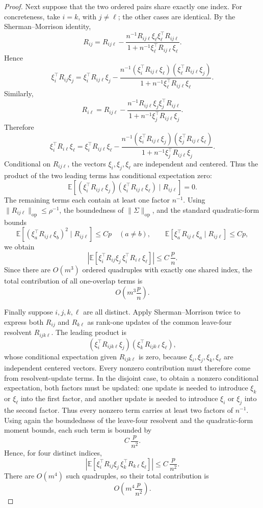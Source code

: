 \documentclass{article}
\theoremstyle{plain}
\theoremstyle{remark}
\def \E{\mathbb{E}}
\begin{document}
\begin{proof}
Next suppose that the two ordered pairs share exactly one index.  For concreteness, take
\(i=k\), with \(j\ne \ell\); the other cases are identical.  By the Sherman--Morrison identity,
\[
R_{ij}
=
R_{ij\ell}
-
\frac{n^{-1}R_{ij\ell}\xi_\ell\xi_\ell^\top R_{ij\ell}}
{1+n^{-1}\xi_\ell^\top R_{ij\ell}\xi_\ell}.
\]
Hence
\[
\xi_i^\top R_{ij}\xi_j
=
\xi_i^\top R_{ij\ell}\xi_j
-
\frac{
n^{-1}(\xi_i^\top R_{ij\ell}\xi_\ell)
(\xi_\ell^\top R_{ij\ell}\xi_j)
}{
1+n^{-1}\xi_\ell^\top R_{ij\ell}\xi_\ell
}.
\]
Similarly,
\[
R_{i\ell}
=
R_{ij\ell}
-
\frac{n^{-1}R_{ij\ell}\xi_j\xi_j^\top R_{ij\ell}}
{1+n^{-1}\xi_j^\top R_{ij\ell}\xi_j}.
\]
Therefore
\[
\xi_i^\top R_{i\ell}\xi_\ell
=
\xi_i^\top R_{ij\ell}\xi_\ell
-
\frac{
n^{-1}(\xi_i^\top R_{ij\ell}\xi_j)
(\xi_j^\top R_{ij\ell}\xi_\ell)
}{
1+n^{-1}\xi_j^\top R_{ij\ell}\xi_j
}.
\]
Conditional on \(R_{ij\ell}\), the vectors \(\xi_i,\xi_j,\xi_\ell\) are independent and centered.
Thus the product of the two leading terms has conditional expectation zero:
\[
\E\left[
(\xi_i^\top R_{ij\ell}\xi_j)
(\xi_i^\top R_{ij\ell}\xi_\ell)
\mid R_{ij\ell}
\right]=0.
\]
The remaining terms each contain at least one factor \(n^{-1}\).  Using
\(\|R_{ij\ell}\|_{\mathrm{op}}\le \rho^{-1}\), the boundedness of \(\|\Sigma\|_{\mathrm{op}}\), and the standard
quadratic-form bounds
\[
\E\left[(\xi_a^\top R_{ij\ell}\xi_b)^2\mid R_{ij\ell}\right]\le Cp
\quad(a\ne b),
\qquad
\E\left[\xi_a^\top R_{ij\ell}\xi_a\mid R_{ij\ell}\right]\le Cp,
\]
we obtain
\[
\left|
\E\left[
\xi_i^\top R_{ij}\xi_j\,
\xi_i^\top R_{i\ell}\xi_\ell
\right]
\right|
\le C\,\frac{p}{n}.
\]
Since there are \(O(m^3)\) ordered quadruples with exactly one shared index, the total contribution
of all one-overlap terms is
\[
O\left(m^3\frac{p}{n}\right).
\]

Finally suppose \(i,j,k,\ell\) are all distinct. Apply Sherman--Morrison twice to express both \(R_{ij}\) and \(R_{k\ell}\) as rank-one updates of
the common leave-four resolvent \(R_{ijk\ell}\).  The leading product is
\[
(\xi_i^\top R_{ijk\ell}\xi_j)(\xi_k^\top R_{ijk\ell}\xi_\ell),
\]
whose conditional expectation given \(R_{ijk\ell}\) is zero, because
\(\xi_i,\xi_j,\xi_k,\xi_\ell\) are independent centered vectors.  Every nonzero contribution must
therefore come from resolvent-update terms.  In the disjoint case, to obtain a nonzero conditional
expectation, both factors must be updated: one update is needed to introduce \(\xi_k\) or \(\xi_\ell\)
into the first factor, and another update is needed to introduce \(\xi_i\) or \(\xi_j\) into the second
factor.  Thus every nonzero term carries at least two factors of \(n^{-1}\).  Using again the
boundedness of the leave-four resolvent and the quadratic-form moment bounds, each such term is
bounded by
\[
C\,\frac{p}{n^2}.
\]
Hence, for four distinct indices,
\[
\left|
\E\left[
\xi_i^\top R_{ij}\xi_j\,
\xi_k^\top R_{k\ell}\xi_\ell
\right]
\right|
\le C\,\frac{p}{n^2}.
\]
There are \(O(m^4)\) such quadruples, so their total contribution is
\[
O\left(m^4\frac{p}{n^2}\right).
\]


\end{proof}
\end{document}
